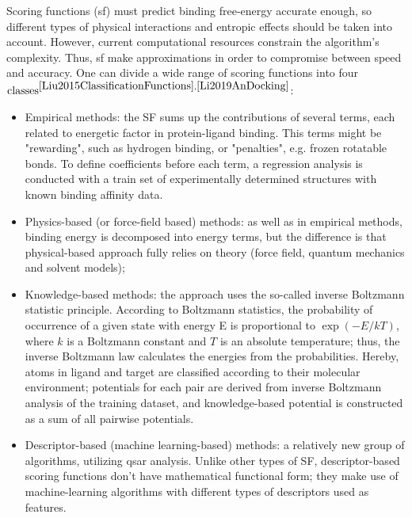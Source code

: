   Scoring functions (\acrshort{sf}) must predict binding free-energy accurate enough, 
so different types of physical interactions and entropic effects should be taken 
into account.
  However, current computational resources constrain the algorithm's complexity.
  Thus, \acrshort{sf} make approximations in order to compromise between speed and 
accuracy. One can divide a wide range of scoring functions into four $\text{classes}^{\cite{Liu2015ClassificationFunctions}, 
\cite{Li2019AnDocking}}$:
  \begin{itemize}
        \item Empirical methods: the SF sums up the contributions of several terms, each related to energetic factor in protein-ligand binding.
        This terms might be "rewarding", such as hydrogen binding, or "penalties", 
e.g. frozen rotatable bonds.
        To define coefficients before each term, a regression analysis is conducted 
with a train set of experimentally determined structures with known binding affinity 
data.
       \item Physics-based (or force-field based) methods: as well as in empirical methods, binding energy is decomposed into energy terms, but the difference is that physical-based approach fully relies on theory (force field, quantum mechanics and solvent models);
      \item Knowledge-based methods: the approach uses the so-called inverse Boltzmann statistic principle.
      According to Boltzmann statistics, the probability of occurrence of a given 
state with energy E is proportional to $\exp{(-E/kT)}$, where $k$ is a Boltzmann 
constant and $T$ is an absolute temperature; thus, the inverse Boltzmann law calculates 
the energies from the probabilities.
      Hereby, atoms in ligand and target are classified according to their molecular 
environment; potentials for each pair are derived from inverse Boltzmann analysis 
of the training dataset, and knowledge-based potential is constructed as a sum of 
all pairwise potentials.
      \item Descriptor-based (machine learning-based) methods: a relatively new group of algorithms, utilizing \acrshort{qsar} analysis.
      Unlike other types of SF, descriptor-based scoring functions don't have mathematical 
functional form; they make use of machine-learning algorithms with different types 
of descriptors used as features. 
  \end{itemize}

